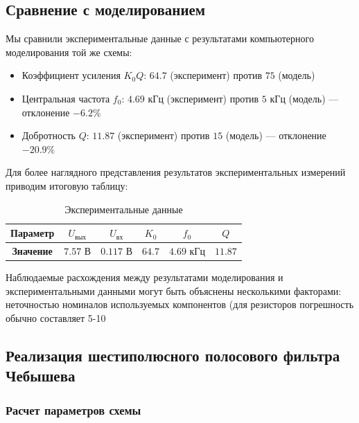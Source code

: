 \subsection{Сравнение с моделированием}

Мы сравнили экспериментальные данные с результатами компьютерного моделирования той же схемы:

\begin{itemize}
    \item Коэффициент усиления $K_0Q$: $64.7$ (эксперимент) против $75$ (модель)
    \item Центральная частота $f_0$: $4.69 \text{ кГц}$ (эксперимент) против $5 \text{ кГц}$ (модель) — отклонение $-6.2\%$
    \item Добротность $Q$: $11.87$ (эксперимент) против $15$ (модель) — отклонение $-20.9\%$
\end{itemize}

Для более наглядного представления результатов экспериментальных измерений приводим итоговую таблицу:

\begin{longtable}[c]{|c|c|c|c|c|c|}
\caption{Экспериментальные данные}
\label{tab:exp_data}\\
\hline
\textbf{Параметр} & $U_{\text{вых}}$ & $U_{\text{вх}}$ & $K_0$ & $f_0$ & $Q$ \\ \hline
\endfirsthead
%
\endhead
%
\textbf{Значение} & $7.57 \text{ В}$ & $0.117 \text{ В}$ & $64.7$ & $4.69 \text{ кГц}$ & $11.87$ \\ \hline
\end{longtable}

Наблюдаемые расхождения между результатами моделирования и экспериментальными данными могут быть объяснены несколькими факторами: неточностью номиналов используемых компонентов (для резисторов погрешность обычно составляет 5-10%

\subsection{Реализация шестиполюсного полосового фильтра Чебышева}

\subsubsection{Расчет параметров схемы}

